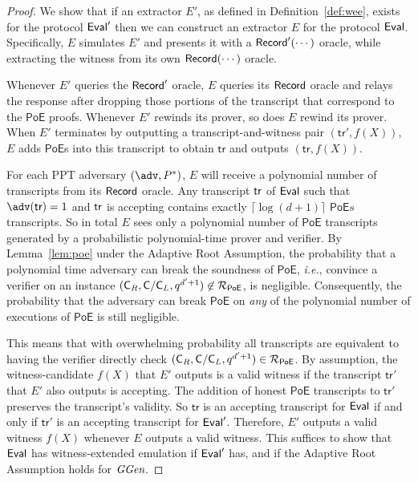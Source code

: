 \begin{proof}
We show that if an extractor $E'$, as defined in Definition~\ref{def:wee}, exists for the protocol $\textsf{{Eval}}'$ then we can construct an extractor $E$ for the protocol $\textsf{{Eval}}$. Specifically, $E$ simulates $E'$ and presents it with a $\textsf{{Record}}'(\cdots)$ oracle, while extracting the witness from its own $\textsf{{Record}}(\cdots)$ oracle.

Whenever $E'$ queries the $\textsf{{Record}}'$ oracle, $E$ queries its $\textsf{{Record}}$ oracle and relays the response after dropping those portions of the transcript that correspond to the $\mathsf{PoE}$ proofs. Whenever $E'$ rewinds its prover, so does $E$ rewind its prover. When $E'$ terminates by outputting a transcript-and-witness pair $(\mathsf{tr}', f(X))$, $E$ adds $\mathsf{PoE}$s into this transcript to obtain $\mathsf{tr}$ and outputs $(\mathsf{tr}, f(X))$.

For each PPT adversary $(\adv,P^*)$, $E$ will receive a polynomial number of transcripts from its $\textsf{{Record}}$ oracle. Any transcript $\textsf{{tr}}$ of $\textsf{{Eval}}$ such that $\adv(\tr)=1$ and $\textsf{{tr}}$ is accepting contains exactly $\lceil \log(d+1)\rceil$ $\textsf{PoE}s$ transcripts. 
So in total $E$ sees only a polynomial number of $\textsf{PoE}$ transcripts generated by a probabilistic polynomial-time prover and verifier. By Lemma~\ref{lem:poe} under the Adaptive Root Assumption, the probability that a polynomial time adversary can break the soundness of $\textsf{PoE}$, \emph{i.e.}, convince a verifier on an instance $(\mathsf{C}_R,\mathsf{C}/\mathsf{C}_{L},q^{d'+1})\not\in\mathcal{R}_{\textsf{PoE}}$, is negligible. 
Consequently, the probability that the adversary can break $\textsf{PoE}$ on \emph{any} of the polynomial number of executions of $\mathsf{PoE}$ is still negligible.

This means that with overwhelming probability all transcripts are equivalent to having the verifier directly check $(\mathsf{C}_R,\mathsf{C}/\mathsf{C}_{L},q^{d'+1})\in\mathcal{R}_{\textsf{PoE}}$. By assumption, the witness-candidate $f(X)$ that $E'$ outputs is a valid witness if the transcript $\mathsf{tr}'$ that $E'$ also outputs is accepting. The addition of honest $\mathsf{PoE}$ transcripts to $\mathsf{tr}'$ preserves the transcript's validity. So $\mathsf{tr}$ is an accepting transcript for $\textsf{{Eval}}$ if and only if $\mathsf{tr}'$ is an accepting transcript for $\textsf{{Eval}}'$. Therefore, $E'$ outputs a valid witness $f(X)$ whenever $E$ outputs a valid witness. This suffices to show that $\textsf{{Eval}}$ has witness-extended emulation if $\textsf{{Eval}}'$ has, and if the Adaptive Root Assumption holds for $\textit{GGen}$.
\end{proof}


